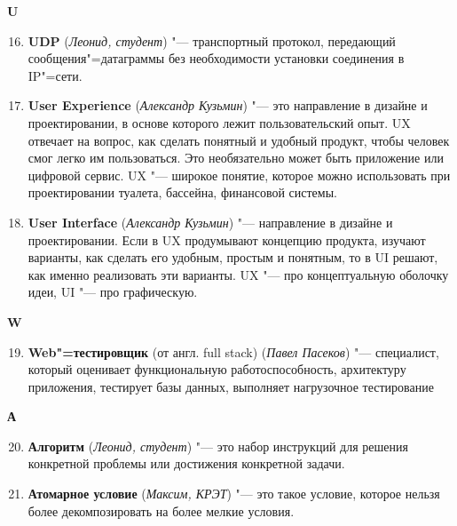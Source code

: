 \begin{flushleft} \large\textbf{U} \end{flushleft}

\begin{enumerate}
    \setcounter{enumi}{15}

    \item \textbf{UDP} (\textit{Леонид, студент}) "--- 
      транспортный протокол, передающий сообщения"=датаграммы без необходимости установки соединения в IP"=сети.
    
    \item\textbf{User Experience} (\textit{Александр Кузьмин}) "--- 
    это направление в дизайне и проектировании, в основе которого лежит пользовательский опыт. UX отвечает на вопрос, как сделать понятный и удобный продукт, чтобы человек смог легко им пользоваться. Это необязательно может быть приложение или цифровой сервис. UX "--- широкое понятие, которое можно использовать при проектировании туалета, бассейна, финансовой системы.

    \item\textbf{User Interface} (\textit{Александр Кузьмин}) "--- 
     направление в дизайне и проектировании. Если в UX продумывают концепцию продукта, изучают варианты, как сделать его удобным, простым и понятным, то в UI решают, как именно реализовать эти варианты. UX "--- про концептуальную оболочку идеи, UI "--- про графическую.
    
    
\end{enumerate}

\begin{flushleft} \large\textbf{W} \end{flushleft}

\begin{enumerate}
    \setcounter{enumi}{18}
    
\item \textbf{Web"=тестировщик} (от англ. full stack) (\textit{Павел Пасеков}) "--- 
    специалист, который оценивает функциональную работоспособность, архитектуру приложения, тестирует базы данных, выполняет нагрузочное тестирование
    
\end{enumerate}

\begin{flushleft} \large\textbf{А} \end{flushleft}

\begin{enumerate}
\setcounter{enumi}{19}
 
     \item \textbf{Алгоритм} (\textit{Леонид, студент}) "--- 
     это набор инструкций для решения конкретной проблемы или достижения конкретной задачи.

     \item \textbf{Атомарное условие} (\textit{Максим, КРЭТ}) "--- 
     это такое условие, которое нельзя более декомпозировать на более мелкие условия.
     
\end{enumerate}

